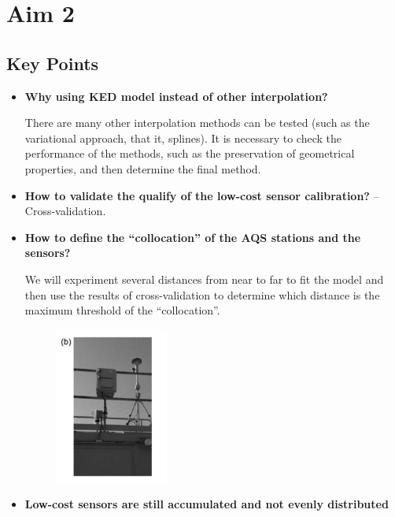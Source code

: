 \documentclass{article}
\begin{document}

\section{Aim 2}
\subsection{Key Points}
\begin{itemize}
    \item \textbf{Why using KED model instead of other interpolation?} {
    
    There are many other interpolation methods can be tested (such as the variational approach, that it, splines). It is necessary to check the performance of the methods, such as the preservation of geometrical properties, and then determine the final method.
    }
    \item \textbf{How to validate the qualify of the low-cost sensor calibration?} -- Cross-validation.
    \item \textbf{How to define the ``collocation'' of the AQS stations and the sensors?} {
    
    We will experiment several distances from near to far to fit the model and then use the results of cross-validation to determine which distance is the maximum threshold of the ``collocation''.
    \begin{figure}[H]
        \centering
        \includegraphics[width=0.35\textwidth]{img/collocation.png}
        \label{fig:col}
    \end{figure}
    }
    \item \textbf{Low-cost sensors are still accumulated and not evenly distributed} {
    
}
\end{itemize}
\end{document}
